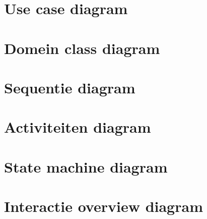 
\section{Use case diagram}
\label{sec:usecase}

\section{Domein class diagram}
\label{sec:domeinclass}

\section{Sequentie diagram}
\label{sec:sequentie}

\section{Activiteiten diagram}
\label{sec:activiteiten}

\section{State machine diagram}
\label{sec:statemachine}

\section{Interactie overview diagram}
\label{sec:interactieoverview}
